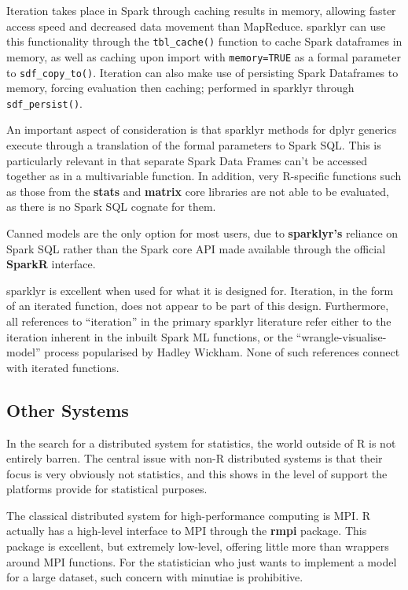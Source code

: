 \documentclass[a4paper,10pt]{article}
\begin{document}
Iteration takes place in Spark through caching results in memory, allowing faster access speed and decreased data movement than MapReduce\cite{zaharia2010spark}.
sparklyr can use this functionality through the \texttt{tbl\_cache()} function to cache Spark dataframes in memory, as well as caching upon import with \texttt{memory=TRUE} as a formal parameter to \texttt{sdf\_copy\_to()}.
Iteration can also make use of persisting Spark Dataframes to memory, forcing evaluation then caching; performed in sparklyr through \texttt{sdf\_persist()}.

An important aspect of consideration is that sparklyr methods for dplyr generics execute through a translation of the formal parameters to Spark SQL.
This is particularly relevant in that separate Spark Data Frames can't be accessed together as in a multivariable function.
In addition, very R-specific functions such as those from the \textbf{stats} and \textbf{matrix} core libraries are not able to be evaluated, as there is no Spark SQL cognate for them.

Canned models are the only option for most users, due to \textbf{sparklyr's} reliance on Spark SQL rather than the Spark core API made available through the official \textbf{SparkR} interface.

sparklyr is excellent when used for what it is designed for.
Iteration, in the form of an iterated function, does not appear to be part of this design. 
Furthermore, all references to ``iteration'' in the primary sparklyr literature refer either to the iteration inherent in the inbuilt Spark ML functions, or the ``wrangle-visualise-model'' process popularised by Hadley Wickham\cite{luraschi2019mastering}\cite{wickham2016r}.
None of such references connect with iterated functions.

\subsection{Other Systems}

In the search for a distributed system for statistics, the world outside of R is not entirely barren.
The central issue with non-R distributed systems is that their focus is very obviously not statistics, and this shows in the level of support the platforms provide for statistical purposes.

The classical distributed system for high-performance computing is MPI.
R actually has a high-level interface to MPI through the \textbf{rmpi} package.
This package is excellent, but extremely low-level, offering little more than wrappers around MPI functions.
For the statistician who just wants to implement a model for a large dataset, such concern with minutiae is prohibitive.\\
\end{document}
